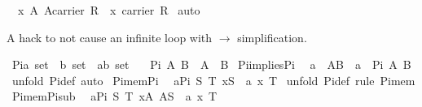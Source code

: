 \begin{isabellebody}
\ \ {\isachardoublequoteopen}{\isasymlbrakk}x\ {\isasymin}A{\isacharsemicolon}\ A{\isasymsubseteq}carrier\ R{\isasymrbrakk}\ {\isasymLongrightarrow}\ x\ {\isasymin}carrier\ R{\isachardoublequoteclose}\isanewline
%
\isadelimproof
%
\endisadelimproof
%
\isatagproof
{}\isamarkupfalse%
\ auto%
\endisatagproof
{\isafoldproof}%
%
\isadelimproof
%
\endisadelimproof
%
\begin{isamarkuptext}%
A hack to not cause an infinite loop with $\to$ simplification.%
\end{isamarkuptext}%
\isamarkuptrue%
\isamarkupfalse%
\ Pi{}{\isacharcolon}{\isacharcolon}{\isachardoublequoteopen}{\isacharparenleft}{\isacharprime}a\ set{\isacharparenright}\ {\isasymRightarrow}\ {\isacharparenleft}{\isacharprime}b\ set{\isacharparenright}\ {\isasymRightarrow}\ {\isacharparenleft}{\isacharprime}a{\isasymRightarrow}{\isacharprime}b{\isacharparenright}\ set{\isachardoublequoteclose}\isanewline
\ \ \ {\isachardoublequoteopen}Pi{}\ A\ B\ {\isacharequal}\ A\ {\isasymrightarrow}\ B{\isachardoublequoteclose}\isanewline
\isanewline
{}\isamarkupfalse%
\ Pi{\isacharunderscore}implies{\isacharunderscore}Pi{}{\isacharcolon}\isanewline
\ \ {\isachardoublequoteopen}a\ {\isasymin}\ A{\isasymrightarrow}B\ {\isasymLongrightarrow}\ a\ {\isasymin}\ Pi{}\ A\ B{\isachardoublequoteclose}\isanewline
%
\isadelimproof
%
\endisadelimproof
%
\isatagproof
{}\isamarkupfalse%
\ {\isacharparenleft}unfold\ Pi{}{\isacharunderscore}def{\isacharcomma}\ auto{\isacharparenright}%
\endisatagproof
{\isafoldproof}%
%
\isadelimproof
\isanewline
%
\endisadelimproof
\isanewline
\isanewline
{}\isamarkupfalse%
\ Pi{\isacharunderscore}mem{\isacharunderscore}Pi{}{\isacharcolon}\isanewline
\ \ {\isachardoublequoteopen}{\isasymlbrakk}a{\isasymin}Pi{}\ S\ T{\isacharsemicolon}\ x{\isasymin}S{\isasymrbrakk}\ {\isasymLongrightarrow}\ a\ x\ {\isasymin}T{\isachardoublequoteclose}\isanewline
%
\isadelimproof
%
\endisadelimproof
%
\isatagproof
{}\isamarkupfalse%
\ {\isacharparenleft}unfold\ Pi{}{\isacharunderscore}def{\isacharcomma}\ rule\ Pi{\isacharunderscore}mem{}{\isacharparenright}%
\endisatagproof
{\isafoldproof}%
%
\isadelimproof
\isanewline
%
\endisadelimproof
\isanewline
{}\isamarkupfalse%
\ Pi{\isacharunderscore}mem{\isacharunderscore}Pi{}{\isacharunderscore}sub{}{\isacharcolon}\isanewline
\ \ {\isachardoublequoteopen}{\isasymlbrakk}a{\isasymin}Pi{}\ S\ T{\isacharsemicolon}\ x{\isasymin}A{\isacharsemicolon}\ A{\isasymsubseteq}S{\isasymrbrakk}\ {\isasymLongrightarrow}\ a\ x\ {\isasymin}T{\isachardoublequoteclose}\isanewline

\end{isabellebody}
